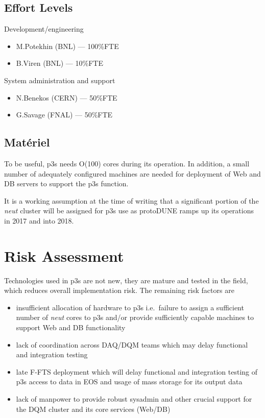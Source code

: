 \documentclass[pdftex,12pt,letter]{article}
\newcommand{\pd}{protoDUNE\xspace}
\begin{document}
\subsection{Effort Levels}

Development/engineering
\begin{itemize}
\item M.Potekhin (BNL) --- 100\%FTE
\item B.Viren (BNL) --- 10\%FTE
\end{itemize}

\noindent System administration and support

\begin{itemize}
\item N.Benekos (CERN) --- 50\%FTE
\item G.Savage (FNAL) --- 50\%FTE
\end{itemize}

\subsection{Mat\'eriel}
To be useful, p3s needs O(100) cores during its operation. In addition,
a small number of adequately configured machines are needed for
deployment of Web and DB servers to support the p3s function.

It is a working assumption at the time of writing that a significant portion of
the \textit{neut} cluster \cite{neut} will be assigned for p3s use as \pd ramps up
its operations in 2017 and into 2018.


\section{Risk Assessment}

Technologies used in p3s are not new, they are mature and tested in the field, which reduces
overall implementation risk. The remaining risk factors are
\begin{itemize}

\item insufficient allocation of hardware to p3s i.e.~failure to assign a sufficient number
of \textit{neut} cores to p3s and/or provide sufficiently capable machines to support Web
and DB functionality

\item lack of coordination across DAQ/DQM teams which may delay functional and integration
testing

\item late F-FTS deployment which will delay functional and integration testing of p3s access
to data in EOS and usage of mass storage for its output data

\item lack of manpower to provide robust sysadmin and other crucial support for the DQM
cluster and its core services (Web/DB)

\end{itemize}
\end{document}
